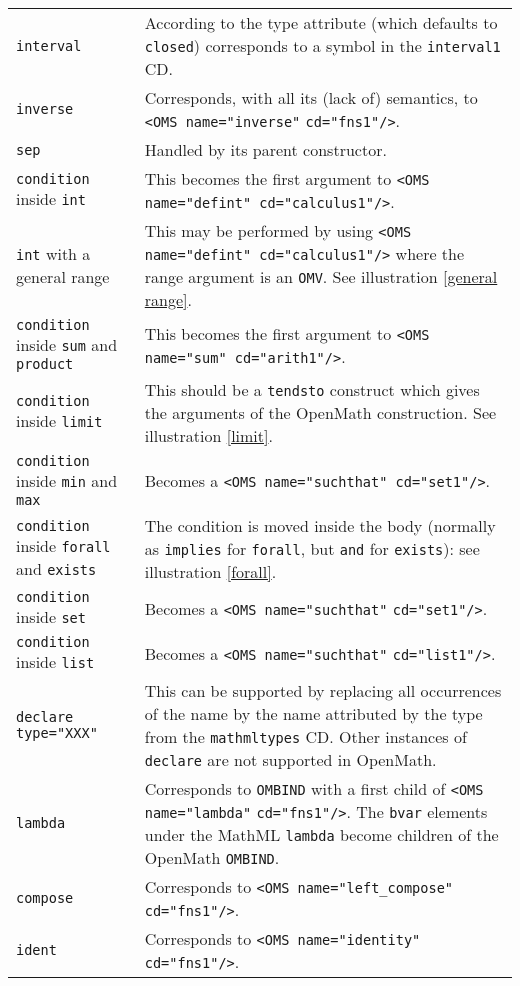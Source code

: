 \documentclass[twoside,11pt]{article}
\begin{document}
\begin{longtable}{
        >{\raggedright\let\\=\tabularnewline}p{2in}
        >{\raggedright\let\\=\tabularnewline}p{3in}}
\verb+interval+&According to the type attribute (which defaults to
\verb+closed+) corresponds to a symbol in the \verb+interval1+ CD.\\
\verb+inverse+&Corresponds, with all its (lack of) semantics, to
\verb+<OMS name="inverse"+ \verb+cd="fns1"/>+.\\
\verb+sep+&Handled by its parent constructor.\\
\verb+condition+ inside \verb+int+&This becomes the first argument to
\verb+<OMS name="defint" cd="calculus1"/>+.\\
\verb+int+ with a general range&This may be performed by using
\verb+<OMS name="defint" cd="calculus1"/>+ where the range argument is
an \verb+OMV+. See illustration \ref{general range}.\\
\verb+condition+ inside \verb+sum+ and \verb+product+&This becomes the
first argument to \verb+<OMS name="sum" cd="arith1"/>+.\\
\verb+condition+ inside \verb+limit+&This should be a \verb+tendsto+
construct which gives the arguments of the OpenMath construction. See
illustration \ref{limit}.\\
\verb+condition+ inside \verb+min+ and \verb+max+&Becomes a
\verb+<OMS name="suchthat" cd="set1"/>+.\\
\verb+condition+ inside \verb+forall+ and \verb+exists+&The condition
is moved inside the body (normally as \verb+implies+ for \verb+forall+, 
but \verb+and+ for \verb+exists+): see illustration \ref{forall}.\\
\verb+condition+ inside \verb+set+&Becomes a
\verb+<OMS name="suchthat"+ \verb+cd="set1"/>+.\\ 
\verb+condition+ inside \verb+list+&Becomes a
\verb+<OMS name="suchthat"+ \verb+cd="list1"/>+.\\
\verb+declare type="XXX"+&This can be supported by replacing all
occurrences of the name by the name attributed by the type from the
\verb+mathmltypes+ CD. Other instances of \verb+declare+ are not
supported in OpenMath.\\
\verb+lambda+&Corresponds to \verb+OMBIND+ with a first child of
\verb+<OMS name="lambda"+ \verb+cd="fns1"/>+. The \verb+bvar+ elements under
the MathML \verb+lambda+ become children of the OpenMath
\verb+OMBIND+.\\
\verb+compose+&Corresponds to \verb+<OMS name="left_compose"+ 
\verb+cd="fns1"/>+.\\
\verb+ident+&Corresponds to \verb+<OMS name="identity"+ \verb+cd="fns1"/>+.\\

\end{longtable}
\end{document}
